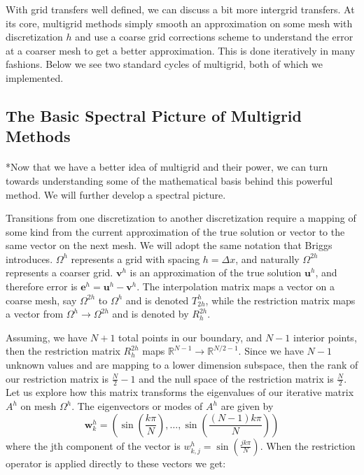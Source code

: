 \documentclass[pdftex,12pt,a4paper]{article}
\begin{document}
With grid transfers well defined, we can discuss a bit more intergrid transfers.  At its core, multigrid methods simply smooth an approximation on some mesh with discretization $h$ and use a coarse grid corrections scheme to understand the error at a coarser mesh to get a better approximation.  This is done iteratively in many fashions.  Below we see two standard cycles of multigrid, both of which we implemented.  


\subsection{The Basic Spectral Picture of Multigrid Methods}
\paragraph{}*Now that we have a better idea of multigrid and their power, we can turn towards understanding some of the mathematical basis behind this powerful method.  We will further develop a spectral picture.  

Transitions from one discretization to another discretization require a mapping of some kind from the current approximation of the true solution or vector to the same vector on the next mesh.  We will adopt the same notation that Briggs introduces.\cite{blue} $\Omega^{h}$ represents a grid with spacing $h = \Delta x $, and naturally $\Omega^{2h}$ represents a coarser grid.   $\mathbf{v}^h$ is an approximation of the true solution $\mathbf{u}^h$, and therefore error is $\mathbf{e}^h = \mathbf{u}^h - \mathbf{v}^h$.  The interpolation matrix maps a vector on a coarse mesh, say $\Omega^{2h}$ to $\Omega^{h}$ and is denoted $T_{2h}^h$, while the restriction matrix maps a vector from $\Omega^{h} \rightarrow \Omega^{2h}$ and is denoted by $R_h^{2h}$.  

Assuming, we have $N+1$ total points in our boundary, and $N-1$ interior points, then the restriction matrix $R_h^{2h}$ maps $\mathbb{R}^{N-1} \rightarrow \mathbb{R}^{N/2 -1}$.  Since we have $N-1$ unknown values and are mapping to a lower dimension subspace, then the rank of our restriction matrix is $\frac{N}{2} -1 $ and the null space of the restriction matrix is $\frac{N}{2}$.  Let us explore how this matrix transforms the eigenvalues of our iterative matrix $A^h$ on mesh $\Omega^h$.  The eigenvectors or modes of $A^h$ are given by 
$$\mathbf{w}_{k}^h = \left( \sin\left( \frac{k \pi}{N}\right), \dots, \sin\left( \frac{(N-1)k \pi}{N}\right) \right)$$ where the jth component of the vector is $w_{k,j}^h = \sin\left( \frac{jk \pi}{N}\right)$.  When the restriction operator is applied directly to these vectors we get: 
\end{document}
